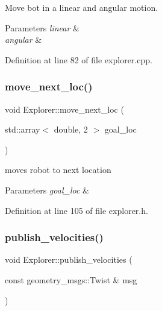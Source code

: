 Move bot in a linear and angular motion. 


\begin{DoxyParams}{Parameters}
{\em linear} & \\
\hline
{\em angular} & \\
\hline
\end{DoxyParams}


Definition at line 82 of file explorer.\+cpp.

\mbox{\label{class_explorer_a2b0c1e46e1a17e99f4156edf5a93b691}} 
\subsubsection{\texorpdfstring{move\+\_\+next\+\_\+loc()}{move\_next\_loc()}}
{\footnotesize\ttfamily void Explorer\+::move\+\_\+next\+\_\+loc (\begin{DoxyParamCaption}\item[{std\+::array$<$ double, 2 $>$}]{goal\+\_\+loc }\end{DoxyParamCaption})\hspace{0.3cm}{\ttfamily [inline]}}



moves robot to next location 


\begin{DoxyParams}{Parameters}
{\em goal\+\_\+loc} & \\
\hline
\end{DoxyParams}


Definition at line 105 of file explorer.\+h.

\mbox{\label{class_explorer_a8ffef25585ef957b9df4407366723787}} 
\subsubsection{\texorpdfstring{publish\+\_\+velocities()}{publish\_velocities()}}
{\footnotesize\ttfamily void Explorer\+::publish\+\_\+velocities (\begin{DoxyParamCaption}\item[{const geometry\+\_\+msgs\+::\+Twist \&}]{msg }\end{DoxyParamCaption})}



